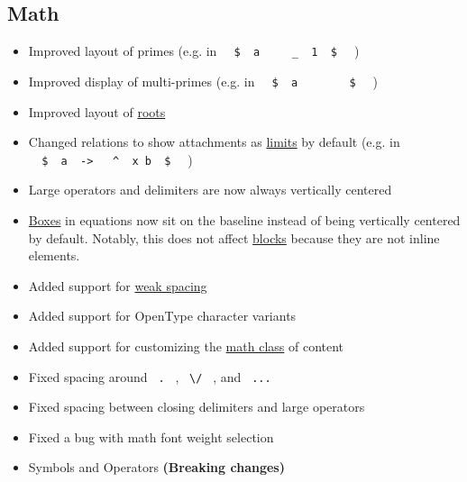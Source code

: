 \subsection{Math}\label{math}

\begin{itemize}
\tightlist
\item
  Improved layout of primes (e.g. in
  \texttt{\ }{\texttt{\ \$\ }}\texttt{\ a\ }{\texttt{\ \textquotesingle{}\ }}\texttt{\ }{\texttt{\ \_\ }}\texttt{\ 1\ }{\texttt{\ \$\ }}\texttt{\ }
  )
\item
  Improved display of multi-primes (e.g. in
  \texttt{\ }{\texttt{\ \$\ }}\texttt{\ a\ }{\texttt{\ \textquotesingle{}\ }}\texttt{\ }{\texttt{\ \textquotesingle{}\ }}\texttt{\ }{\texttt{\ \$\ }}\texttt{\ }
  )
\item
  Improved layout of
  \href{/docs/reference/math/roots/\#functions-root}{roots}
\item
  Changed relations to show attachments as
  \href{/docs/reference/math/attach/\#functions-limits}{limits} by
  default (e.g. in
  \texttt{\ }{\texttt{\ \$\ }}\texttt{\ a\ }{\texttt{\ -\textgreater{}\ }}\texttt{\ }{\texttt{\ \^{}\ }}\texttt{\ x\ b\ }{\texttt{\ \$\ }}\texttt{\ }
  )
\item
  Large operators and delimiters are now always vertically centered
\item
  \href{/docs/reference/layout/box/}{Boxes} in equations now sit on the
  baseline instead of being vertically centered by default. Notably,
  this does not affect \href{/docs/reference/layout/block/}{blocks}
  because they are not inline elements.
\item
  Added support for
  \href{/docs/reference/layout/h/\#parameters-weak}{weak spacing}
\item
  Added support for OpenType character variants
\item
  Added support for customizing the
  \href{/docs/reference/math/class/}{math class} of content
\item
  Fixed spacing around \texttt{\ .\ } , \texttt{\ \textbackslash{}/\ } ,
  and \texttt{\ ...\ }
\item
  Fixed spacing between closing delimiters and large operators
\item
  Fixed a bug with math font weight selection
\item
  Symbols and Operators \textbf{(Breaking changes)}


\end{itemize}
